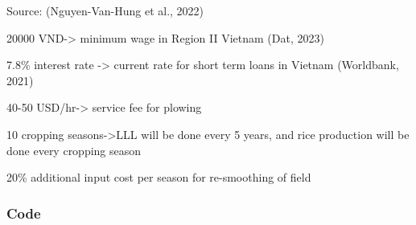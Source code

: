 \documentclass[
]{article}
\begin{document}
Source: (Nguyen-Van-Hung et al., 2022)

20000 VND-\textgreater{} minimum wage in Region II Vietnam (Dat, 2023)

7.8\% interest rate -\textgreater{} current rate for short term loans in
Vietnam (Worldbank, 2021)

40-50 USD/hr-\textgreater{} service fee for plowing

10 cropping seasons-\textgreater LLL will be done every 5 years, and
rice production will be done every cropping season

20\% additional input cost per season for re-smoothing of field

\hypertarget{code}{%
\subsubsection{Code}\label{code}}
\end{document}
